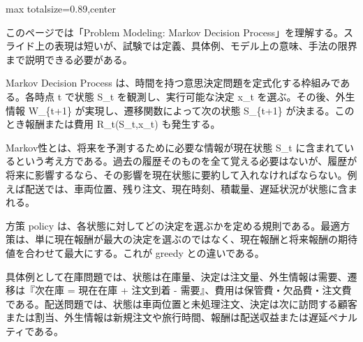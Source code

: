 \begin{minipage}[t]{0.58\textwidth}
\begin{adjustbox}{max totalsize={\textwidth}{0.89\textheight},center}
\begin{minipage}{\textwidth}\scriptsize
{}このページでは「Problem Modeling: Markov Decision Process」を理解する。スライド上の表現は短いが、試験では定義、具体例、モデル上の意味、手法の限界まで説明できる必要がある。\par
Markov Decision Process は、時間を持つ意思決定問題を定式化する枠組みである。各時点 t で状態 S\_t を観測し、実行可能な決定 x\_t を選ぶ。その後、外生情報 W\_\{t+1\} が実現し、遷移関数によって次の状態 S\_\{t+1\} が決まる。このとき報酬または費用 R\_t(S\_t,x\_t) も発生する。\par
Markov性とは、将来を予測するために必要な情報が現在状態 S\_t に含まれているという考え方である。過去の履歴そのものを全て覚える必要はないが、履歴が将来に影響するなら、その影響を現在状態に要約して入れなければならない。例えば配送では、車両位置、残り注文、現在時刻、積載量、遅延状況が状態に含まれる。\par
方策 policy は、各状態に対してどの決定を選ぶかを定める規則である。最適方策は、単に現在報酬が最大の決定を選ぶのではなく、現在報酬と将来報酬の期待値を合わせて最大にする。これが greedy との違いである。\par
具体例として在庫問題では、状態は在庫量、決定は注文量、外生情報は需要、遷移は『次在庫 = 現在在庫 + 注文到着 - 需要』、費用は保管費・欠品費・注文費である。配送問題では、状態は車両位置と未処理注文、決定は次に訪問する顧客または割当、外生情報は新規注文や旅行時間、報酬は配送収益または遅延ペナルティである。\par

\end{minipage}
\end{adjustbox}
\end{minipage}
